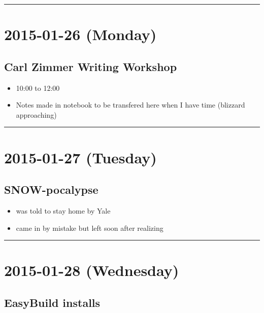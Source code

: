 \documentclass[letterpaper]{scrartcl}
\begin{document}
\begin{center}\rule{0.5\linewidth}{\linethickness}\end{center}

\section{2015-01-26 (Monday)}\label{monday-3}

\subsection{Carl Zimmer Writing
Workshop}\label{carl-zimmer-writing-workshop}

\begin{itemize}
\itemsep1pt\parskip0pt
\item
  10:00 to 12:00
\item
  Notes made in notebook to be transfered here when I have time
  (blizzard approaching)
\end{itemize}

\begin{center}\rule{0.5\linewidth}{\linethickness}\end{center}

\section{2015-01-27 (Tuesday)}\label{tuesday-3}

\subsection{SNOW-pocalypse}\label{snow-pocalypse}

\begin{itemize}
\itemsep1pt\parskip0pt
\item
  was told to stay home by Yale
\item
  came in by mistake but left soon after realizing
\end{itemize}

\begin{center}\rule{0.5\linewidth}{\linethickness}\end{center}

\section{2015-01-28 (Wednesday)}\label{wednesday-2}

\subsection{EasyBuild installs}\label{easybuild-installs-4}
\end{document}
